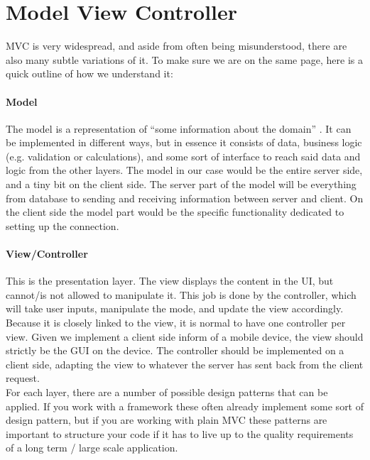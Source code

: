 \section{Model View Controller}
\label{sec:mvc}




MVC is very widespread, and aside from often being misunderstood, there are also many subtle variations of it. To make sure we are on the same page, here is a quick outline of how we understand it:

\paragraph{Model} The model is a representation of “some information about the domain” \cite{fowler}. It can be implemented in different ways, but in essence it consists of data, business logic (e.g. validation or calculations), and some sort of interface to reach said data and logic from the other layers. The model in our case would be the entire server side, and a tiny bit on the client side. The server part of the model will be everything from database to sending and receiving information between server and client. On the client side the model part would be the specific functionality dedicated to setting up the connection.

\paragraph{View/Controller} This is the presentation layer. The view displays the content in the UI, but cannot/is not allowed to manipulate it. This job is done by the controller, which will take user inputs, manipulate the mode, and update the view accordingly. Because it is closely linked to the view, it is normal to have one controller per view. Given we implement a client side inform of a mobile device, the view should strictly be the GUI on the device. The controller should be implemented on a client side, adapting the view to whatever the server has sent back from the client request.\\

For each layer, there are a number of possible design patterns that can be applied. If you work with a framework these often already implement some sort of design pattern, but if you are working with plain MVC these patterns are important to structure your code if it has to live up to the quality requirements of a long term / large scale application.



